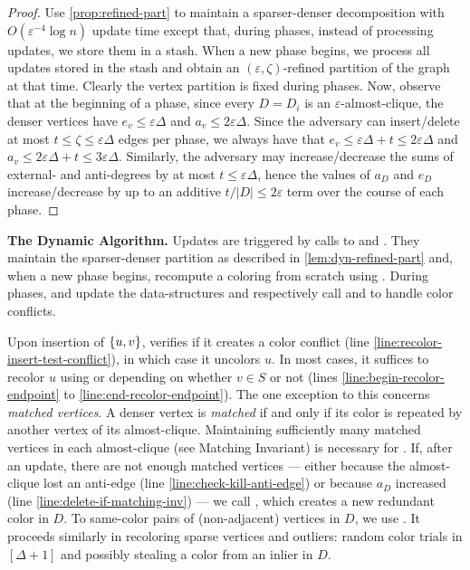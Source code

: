 \documentclass[a4paper,english,11pt]{amsart}
\renewcommand{\paragraph}[1]{\medskip\noindent\textbf{#1}}
\theoremstyle{definition}
\renewcommand{\leq}{\leqslant}
\DeclarePairedDelimiter{\set}{\{}{\}}
\newcommand{\eps}{\varepsilon}
\begin{document}
\begin{proof}
    Use \cref{prop:refined-part} to maintain a sparser-denser decomposition with $O(\eps^{-4}\log n)$ update time except that, during phases, instead of processing updates, we store them in a stash. When a new phase begins, we process all updates stored in the stash and obtain an $(\eps,\zeta)$-refined partition of the graph at that time. Clearly the vertex partition is fixed during phases. Now, observe that at the beginning of a phase, since every $D = D_i$ is an $\eps$-almost-clique, the denser vertices have $e_v \leq \eps\Delta$ and $a_v \leq 2\eps\Delta$. Since the adversary can insert/delete at most $t \leq \zeta \leq \eps\Delta$ edges per phase, we always have that $e_v \leq \eps\Delta + t \leq 2\eps\Delta$ and $a_v \leq 2\eps\Delta + t \leq 3\eps\Delta$. Similarly, the adversary may increase/decrease the sums of external- and anti-degrees by at most $t \leq \eps\Delta$, hence the values of $a_D$ and $e_D$ increase/decrease by up to an additive $t/|D| \leq 2\eps$ term over the course of each phase.
\end{proof}


\paragraph{The Dynamic Algorithm.}
Updates are triggered by calls to \Insert and \Delete. They maintain the sparser-denser partition as described in \cref{lem:dyn-refined-part} and, when a new phase begins, recompute a coloring from scratch using \FreshColoring. During phases, \Insert and \Delete update the data-structures and respectively call \RecolorInsert and \RecolorDelete to handle color conflicts.

Upon insertion of $\set{u,v}$, \RecolorInsert verifies if it creates a color conflict (line \ref{line:recolor-insert-test-conflict}), in which case it uncolors $u$. In most cases, it suffices to recolor $u$ using \RecolorSparse or \RecolorDense depending on whether $v\in S$ or not (lines \ref{line:begin-recolor-endpoint} to \ref{line:end-recolor-endpoint}). The one exception to this concerns \emph{matched vertices}. A denser vertex is \emph{matched} if and only if its color is repeated by another vertex of its almost-clique. Maintaining sufficiently many matched vertices in each almost-clique (see Matching Invariant) is necessary for \RecolorDense. If, after an update, there are not enough matched vertices --- either because the almost-clique lost an anti-edge (line \ref{line:check-kill-anti-edge}) or because $a_D$ increased (line \ref{line:delete-if-matching-inv}) --- we call , which creates a new redundant color in $D$. To same-color pairs of (non-adjacent) vertices in $D$, we use \RecolorMatching. It proceeds similarly in recoloring sparse vertices and outliers: random color trials in $[\Delta+1]$ and possibly stealing a color from an inlier in $D$.
\end{document}

